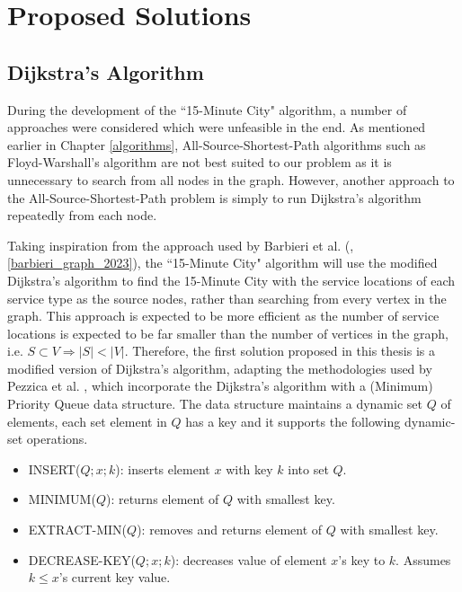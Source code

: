 \chapter{Proposed Solutions} \label{proposed_solution}

\section{Dijkstra's Algorithm}

During the development of the ``15-Minute City" algorithm, a number of approaches were considered which were unfeasible in the end. As mentioned earlier in Chapter \ref{algorithms}, All-Source-Shortest-Path algorithms such as Floyd-Warshall's algorithm are not best suited to our problem as it is unnecessary to search from all nodes in the graph. However, another approach to the All-Source-Shortest-Path problem is simply to run Dijkstra's algorithm repeatedly from each node.

Taking inspiration from the approach used by Barbieri et al. (\cite{barbieri_graph_2023}, \ref{barbieri_graph_2023}), the ``15-Minute City" algorithm will use the modified Dijkstra's algorithm to find the 15-Minute City with the service locations of each service type as the source nodes, rather than searching from every vertex in the graph. This approach is expected to be more efficient as the number of service locations is expected to be far smaller than the number of vertices in the graph, $\text{i.e. }S\subset V\Rightarrow|S|<|V|$. Therefore, the first solution proposed in this thesis is a modified version of Dijkstra's algorithm, adapting the methodologies used by Pezzica et al. \cite{cormen2022introduction}, which incorporate the Dijkstra's algorithm with a (Minimum) Priority Queue data structure. The data structure maintains a dynamic set $Q$ of elements, each set element in $Q$ has a key and it supports the following dynamic-set operations.

\begin{itemize}
    \item INSERT($Q; x; k$): inserts element $x$ with key $k$ into set $Q$.
    \item MINIMUM($Q$): returns element of $Q$ with smallest key.
    \item EXTRACT-MIN($Q$): removes and returns element of $Q$ with smallest key.
    \item DECREASE-KEY($Q;x;k$): decreases value of element $x$'s key to $k$. Assumes $k\leq x$'s current key value.
\end{itemize}

